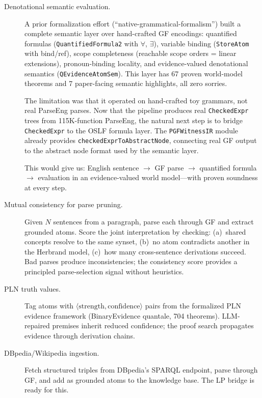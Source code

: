 \documentclass[]{article}
\newcommand{\code}[1]{\texttt{#1}}
\begin{document}
\begin{description}
\item[Denotational semantic evaluation.]
  A prior formalization effort (``native-grammatical-formalism'')
  built a complete semantic layer over hand-crafted GF encodings:
  quantified formulas (\code{QuantifiedFormula2} with $\forall$,
  $\exists$), variable binding (\code{StoreAtom} with bind/ref),
  scope completeness (reachable scope orders = linear extensions),
  pronoun-binding locality, and evidence-valued denotational
  semantics (\code{QEvidenceAtomSem}).  This layer has 67 proven
  world-model theorems and 7 paper-facing semantic highlights,
  all zero sorries.

  The limitation was that it operated on hand-crafted toy grammars,
  not real ParseEng parses.  Now that the pipeline produces
  real \code{CheckedExpr} trees from 115K-function ParseEng, the
  natural next step is to bridge \code{CheckedExpr} to the OSLF
  formula layer.  The \code{PGFWitnessIR} module already provides
  \code{checkedExprToAbstractNode}, connecting real GF output to
  the abstract node format used by the semantic layer.

  This would give us: English sentence $\to$ GF parse $\to$
  quantified formula $\to$ evaluation in an evidence-valued
  world model---with proven soundness at every step.

\item[Mutual consistency for parse pruning.]
  Given $N$ sentences from a paragraph, parse each through GF and
  extract grounded atoms.  Score the joint interpretation by
  checking: (a)~shared concepts resolve to the same synset,
  (b)~no atom contradicts another in the Herbrand model,
  (c)~how many cross-sentence derivations succeed.
  Bad parses produce inconsistencies; the consistency score
  provides a principled parse-selection signal without heuristics.

\item[PLN truth values.] Tag atoms with $\langle\text{strength},
  \text{confidence}\rangle$ pairs from the formalized PLN evidence
  framework (BinaryEvidence quantale, 704 theorems).  LLM-repaired
  premises inherit reduced confidence; the proof search propagates
  evidence through derivation chains.

\item[DBpedia/Wikipedia ingestion.] Fetch structured triples from
  DBpedia's SPARQL endpoint, parse through GF, and add as grounded
  atoms to the knowledge base.  The LP bridge is ready for this.


\end{description}
\end{document}
